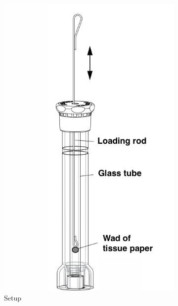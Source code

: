 \begin{figure}
	\centering
	\begin{subfigure}{0.48\textwidth}
		\includegraphics[width=0.9\linewidth]{./Exp1-11/pic/adiabsetup}
		\caption{Setup}
	\end{subfigure}
\begin{subfigure}{0.48\textwidth}
	\centering

\end{subfigure}
\end{figure}
